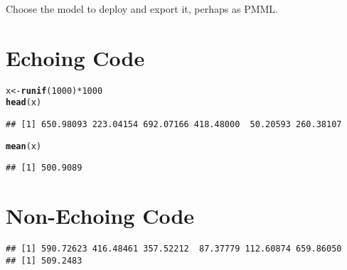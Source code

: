 \documentclass[a4paper]{article}\usepackage[]{graphicx}\usepackage[]{color}
\makeatletter
\newcommand{\hlnum}[1]{\textcolor[rgb]{0.686,0.059,0.569}{#1}}%
\newcommand{\hlopt}[1]{\textcolor[rgb]{0,0,0}{#1}}%
\newcommand{\hlstd}[1]{\textcolor[rgb]{0.345,0.345,0.345}{#1}}%
\newcommand{\hlkwb}[1]{\textcolor[rgb]{0.69,0.353,0.396}{#1}}%
\newcommand{\hlkwd}[1]{\textcolor[rgb]{0.737,0.353,0.396}{\textbf{#1}}}%
\newenvironment{kframe}{%
 \def\at@end@of@kframe{}%
 \ifinner\ifhmode%
  \def\at@end@of@kframe{\end{minipage}}%
  \begin{minipage}{\columnwidth}%
 \fi\fi%
 \def\FrameCommand##1{\hskip\@totalleftmargin \hskip-\fboxsep
 \colorbox{shadecolor}{##1}\hskip-\fboxsep
     \hskip-\linewidth \hskip-\@totalleftmargin \hskip\columnwidth}%
 \MakeFramed {\advance\hsize-\width
   \@totalleftmargin\z@ \linewidth\hsize
   \@setminipage}}%
 {\par\unskip\endMakeFramed%
 \at@end@of@kframe}
\newenvironment{knitrout}{}{} %
\makeatother
\begin{document}
Choose the model to deploy and export it, perhaps as PMML.

\section{Echoing Code}

\begin{knitrout}
\color{fgcolor}\begin{kframe}
\begin{alltt}
\hlstd{x} \hlkwb{<-} \hlkwd{runif}\hlstd{(}\hlnum{1000}\hlstd{)} \hlopt{*} \hlnum{1000}
\hlkwd{head}\hlstd{(x)}
\end{alltt}
\begin{verbatim}
## [1] 650.98093 223.04154 692.07166 418.48000  50.20593 260.38107
\end{verbatim}
\begin{alltt}
\hlkwd{mean}\hlstd{(x)}
\end{alltt}
\begin{verbatim}
## [1] 500.9089
\end{verbatim}
\end{kframe}
\end{knitrout}

\section{Non-Echoing Code}

\begin{knitrout}
\color{fgcolor}\begin{kframe}
\begin{verbatim}
## [1] 590.72623 416.48461 357.52212  87.37779 112.60874 659.86050
## [1] 509.2483
\end{verbatim}
\end{kframe}
\end{knitrout}
\end{document}
